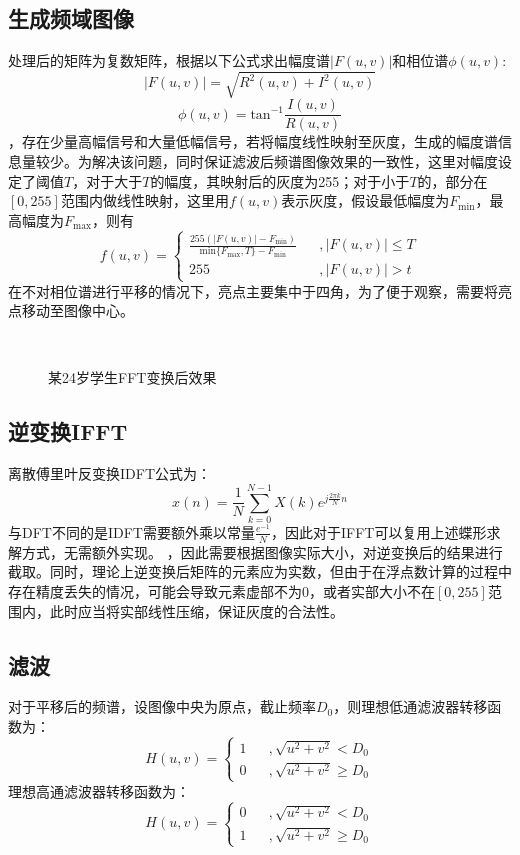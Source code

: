 \documentclass[UTF8]{ctexart}
\begin{document}
	\subsection{生成频域图像}
		处理后的矩阵为复数矩阵，根据以下公式求出幅度谱$|F(u,v)|$和相位谱$\phi(u,v)$:
		\[
			|F(u,v)| = \sqrt{R^2(u,v) + I^2(u,v)}
		\]
		\[
			\phi(u,v) = \textrm{tan}^{-1}\frac{I(u,v)}{R(u,v)}
		\]
		，存在少量高幅信号和大量低幅信号，若将幅度线性映射至灰度，生成的幅度谱信息量较少。为解决该问题，同时保证滤波后频谱图像效果的一致性，这里对幅度设定了阈值$T$，对于大于$T$的幅度，其映射后的灰度为255；对于小于$T$的，部分在$[0,255]$范围内做线性映射，这里用$f(u,v)$表示灰度，假设最低幅度为$F_{\textrm{min}}$，最高幅度为$F_{\textrm{max}}$，则有
		\[
			f(u,v) = \left\{
				\begin{array}{lcl}
				\frac{255(|F(u,v)|-F_{\textrm{min}})}{\textrm{min}\{F_{\textrm{max}},T\}-F_{\textrm{min}} } & &, {|F(u,v)| \leq T} \\
				255 & &, {|F(u,v)| > t}
				\end{array}
			\right.
		\]
		在不对相位谱进行平移的情况下，亮点主要集中于四角，为了便于观察，需要将亮点移动至图像中心。

		\begin{figure}[htbp]
		\centering
		 \\
		\caption{某24岁学生FFT变换后效果}
		\end{figure}

	\subsection{逆变换IFFT}
		离散傅里叶反变换IDFT公式为：
		\[
			x(n) = \frac{1}{N}\sum_{k=0}^{N-1}X(k)e^{j\frac{2\pi k}{N}n}
		\]
		与DFT不同的是IDFT需要额外乘以常量$\frac{e^{-1}}{N}$，因此对于IFFT可以复用上述蝶形求解方式，无需额外实现。
		，因此需要根据图像实际大小，对逆变换后的结果进行截取。同时，理论上逆变换后矩阵的元素应为实数，但由于在浮点数计算的过程中存在精度丢失的情况，可能会导致元素虚部不为0，或者实部大小不在$[0,255]$范围内，此时应当将实部线性压缩，保证灰度的合法性。

	\subsection{滤波}
		对于平移后的频谱，设图像中央为原点，截止频率$D_0$，则理想低通滤波器转移函数为：
		\[
			H(u,v) = \left\{
			\begin{array}{lcl}
			1 & &, {\sqrt{u^2+v^2} < D_0} \\
			0 & &, {\sqrt{u^2+v^2} \ge D_0}
			\end{array}
			\right.
		\]
		理想高通滤波器转移函数为：
		\[
			H(u,v) = \left\{
			\begin{array}{lcl}
			0 & &, {\sqrt{u^2+v^2} < D_0} \\
			1 & &, {\sqrt{u^2+v^2} \ge D_0}
			\end{array}
			\right.
		\]
\end{document}
